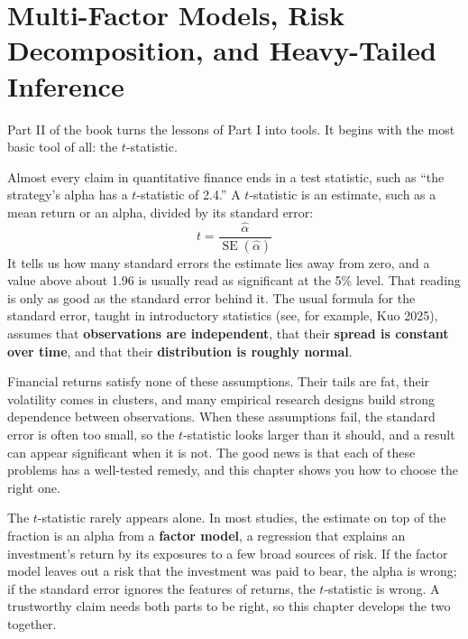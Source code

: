 
\chapter{Multi-Factor Models, Risk Decomposition, and Heavy-Tailed Inference}
\label{ch:03}

Part II of the book turns the lessons of Part I into tools. It begins with the most basic tool of all: the $t$-statistic.

Almost every claim in quantitative finance ends in a test statistic, such as ``the strategy's alpha has a $t$-statistic of 2.4.'' A $t$-statistic is an estimate, such as a mean return or an alpha, divided by its standard error:
\begin{equation}
  t = \frac{\hat{\alpha}}{\operatorname{SE}(\hat{\alpha})}
  \label{eq:03-tstat}
\end{equation}
It tells us how many standard errors the estimate lies away from zero, and a value above about 1.96 is usually read as significant at the 5\% level. That reading is only as good as the standard error behind it. The usual formula for the standard error, taught in introductory statistics (see, for example, Kuo 2025), assumes that \textbf{observations are independent}, that their \textbf{spread is constant over time}, and that their \textbf{distribution is roughly normal}.

Financial returns satisfy none of these assumptions. Their tails are fat, their volatility comes in clusters, and many empirical research designs build strong dependence between observations. When these assumptions fail, the standard error is often too small, so the $t$-statistic looks larger than it should, and a result can appear significant when it is not. The good news is that each of these problems has a well-tested remedy, and this chapter shows you how to choose the right one.

The $t$-statistic rarely appears alone. In most studies, the estimate on top of the fraction is an alpha from a \textbf{factor model}, a regression that explains an investment's return by its exposures to a few broad sources of risk. If the factor model leaves out a risk that the investment was paid to bear, the alpha is wrong; if the standard error ignores the features of returns, the $t$-statistic is wrong. A trustworthy claim needs both parts to be right, so this chapter develops the two together.

